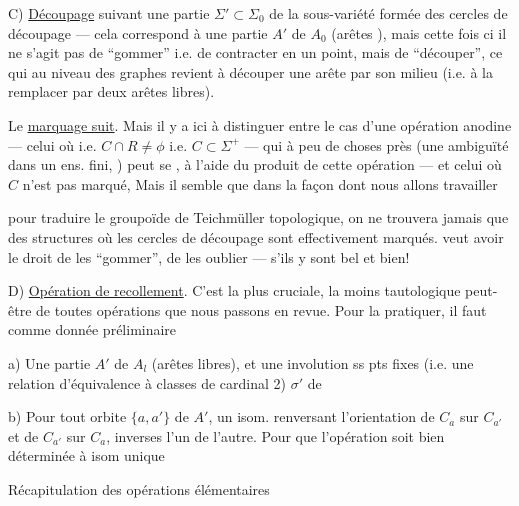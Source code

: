 C) \uline{Découpage}  suivant une partie 
$\Sigma'\subset\Sigma_0$ de la sous-variété formée des cercles de découpage --- cela correspond à une partie $A'$ de $A_0$ (arêtes  ), mais cette fois ci il ne s'agit pas de ``gommer'' i.e. de contracter en un point, mais de ``découper'', ce qui au niveau des graphes revient à découper une arête par son milieu (i.e. à la remplacer par deux arêtes libres).

Le \uline{marquage suit}. 
Mais il y a ici à distinguer entre le cas d'une opération anodine  --- celui
où 
 i.e. $C\cap R\ne\phi$ i.e. $C\subset\Sigma^+$ --- qui à peu de choses près (une ambiguïté dans un ens. fini, \deleted{)} ) peut se , à l'aide du produit de cette opération --- et celui où $C$ n'est pas marqué,
Mais il semble que dans la façon dont nous allons travailler

pour  traduire le groupoïde de Teichmüller topologique, on ne trouvera jamais que des structures où les cercles de découpage sont effectivement marqués.
 veut avoir le droit de les ``gommer'', de les oublier  ---  s'ils y sont bel et bien!

D) \uline{Opération de recollement}. C'est la plus cruciale, la moins tautologique peut-être de toutes  opérations que nous passons en revue.
Pour la pratiquer, il faut comme donnée préliminaire

a) Une partie  $A'$ de $A_l$ (arêtes libres), et une involution ss pts fixes (i.e. une relation d'équivalence à classes de cardinal 2) $\sigma'$ de  

b) Pour  tout orbite  $\{a,a'\}$ de $A'$, un isom. renversant l'orientation de $C_a$ sur $C_{a'}$ et de $C_{a'}$ sur $C_a$, inverses l'un de l'autre.
Pour que l'opération soit bien déterminée à isom unique

Récapitulation des opérations élémentaires

